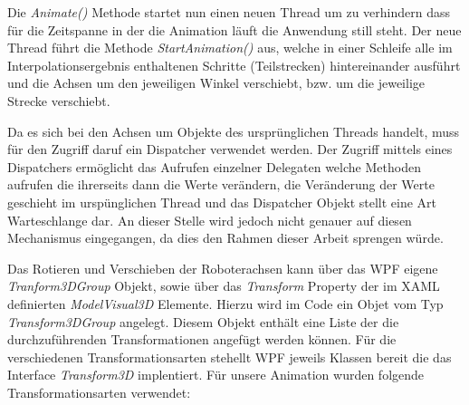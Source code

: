 Die \textit{Animate()} Methode startet nun einen neuen Thread um zu verhindern dass für die Zeitspanne in der die Animation läuft die Anwendung still steht. Der neue Thread führt die Methode \textit{StartAnimation()} aus, welche in einer Schleife alle im Interpolationsergebnis enthaltenen Schritte (Teilstrecken) hintereinander ausführt und die Achsen um den jeweiligen Winkel verschiebt, bzw. um die jeweilige Strecke verschiebt. 

Da es sich bei den Achsen um Objekte des ursprünglichen Threads handelt, muss für den Zugriff daruf ein Dispatcher verwendet werden. Der Zugriff mittels eines Dispatchers ermöglicht das Aufrufen einzelner Delegaten welche Methoden aufrufen die ihrerseits dann die Werte verändern, die Veränderung der Werte geschieht im urspünglichen Thread und das Dispatcher Objekt stellt eine Art Warteschlange dar. An dieser Stelle wird jedoch nicht genauer auf diesen Mechanismus eingegangen, da dies den Rahmen dieser Arbeit sprengen würde.

Das Rotieren und Verschieben der Roboterachsen kann über das WPF eigene \textit{Tranform3DGroup} Objekt, sowie über das \textit{Transform} Property der im XAML definierten \textit{ModelVisual3D} Elemente.
Hierzu wird im Code ein Objet vom Typ \textit{ Transform3DGroup} angelegt. Diesem Objekt enthält eine Liste der die durchzuführenden Transformationen angefügt werden können. Für die verschiedenen Transformationsarten stehellt WPF jeweils Klassen bereit die das Interface \textit{Transform3D} implentiert. Für unsere Animation wurden folgende Transformationsarten verwendet:


